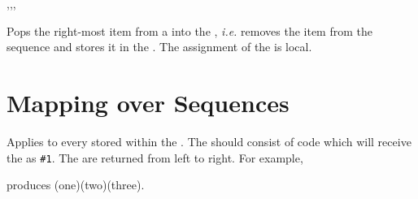 \documentclass[oneside]{book}
\begin{document}
\begin{function}{\SeqPopRight,\SeqPopRightT,\SeqPopRightF,\SeqPopRightTF}
\begin{syntax}
  
   
   
    
\end{syntax}
Pops the right-most item from a  into the
, \emph{i.e.} removes the item from the
sequence and stores it in the .
The assignment of the  is local.
\begin{demohigh}
\SeqSetFromClist {}
\SeqPopRight \lTmpaSeq \lTmpaTl
\SeqVarJoin \lTmpaSeq {,}
\end{demohigh}
\end{function}

\section{Mapping over Sequences}



\begin{function}{\SeqVarMapInline}
\begin{syntax}
  
\end{syntax}
Applies  to every  stored
within the . The  should
consist of code which will receive the  as \verb|#1|.
The  are returned from left to right. For example,
\begin{codehigh}
\IgnoreSpacesOn
\SeqSetFromClist {}
\TlClear \lTmpaTl
\SeqVarMapInline {}
\Result {\TlUse\lTmpaTl}
\IgnoreSpacesOff
\end{codehigh}
produces (one)(two)(three).
\end{function}
\end{document}

